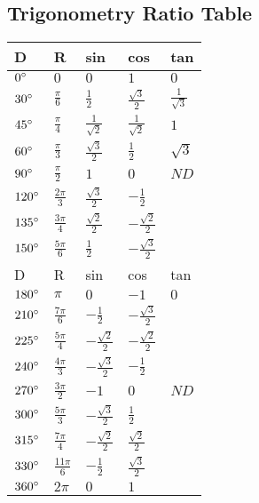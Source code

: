 \documentclass{extarticle}
\begin{document}
\begin{multicols}{2}
\section{Trigonometry Ratio Table}
    \begin{tabu}{|X|X|X|X|X|}
    \hline
D				& R					& sin				& cos						& tan						\\ \hline
$0\degree$	& $0$					& $0$				& $1$						& $0$						\\ \hline
$30\degree$	& $\frac{\pi}{6}$	& $\frac{1}{2}$	& $\frac{\sqrt{3}}{2}$	& $\frac{1}{\sqrt{3}}$	\\ \hline
$45\degree$	& $\frac{\pi}{4}$	& $\frac{1}{\sqrt{2}}$	& $\frac{1}{\sqrt{2}}$	& $1$	\\ \hline
$60\degree$	& $\frac{\pi}{3}$	& $\frac{\sqrt{3}}{2}$	& $\frac{1}{2}$	& $\sqrt{3}$	\\ \hline
$90\degree$	& $\frac{\pi}{2}$	& $1$	& $0$	& $ND$	\\ \hline
$120\degree$	& $\frac{2\pi}{3}$	& $\frac{\sqrt{3}}{2}$	& $-\frac{1}{2}$	& $ $	\\ \hline
$135\degree$	& $\frac{3\pi}{4}$	& $\frac{\sqrt{2}}{2}$	& $-\frac{\sqrt{2}}{2}$	& $ $	\\ \hline
$150\degree$	& $\frac{5\pi}{6}$	& $\frac{1}{2}$	& $-\frac{\sqrt{3}}{2}$	& $ $	\\ \hline
D				& R					& sin				& cos						& tan						\\ \hline
$180\degree$	& $\pi$					& $0$				& $-1$						& $0$						\\ \hline
$210\degree$	& $\frac{7\pi}{6}$	& $-\frac{1}{2}$	& $-\frac{\sqrt{3}}{2}$	& $ $	\\ \hline
$225\degree$	& $\frac{5\pi}{4}$	& $-\frac{\sqrt{2}}{2}$	& $-\frac{\sqrt{2}}{2}$	& $ $	\\ \hline
$240\degree$	& $\frac{4\pi}{3}$	& $-\frac{\sqrt{3}}{2}$	& $-\frac{1}{2}$	& $ $	\\ \hline
$270\degree$	& $\frac{3\pi}{2}$	& $-1$	& $0$	& $ND$	\\ \hline
$300\degree$	& $\frac{5\pi}{3}$	& $-\frac{\sqrt{3}}{2}$	& $\frac{1}{2}$	& $ $	\\ \hline
$315\degree$	& $\frac{7\pi}{4}$	& $-\frac{\sqrt{2}}{2}$	& $\frac{\sqrt{2}}{2}$	& $ $	\\ \hline
$330\degree$	& $\frac{11\pi}{6}$	& $-\frac{1}{2}$	& $\frac{\sqrt{3}}{2}$	& $ $	\\ \hline


$360\degree$ & $2\pi$ & $0$ & $1$ & $ $ \\ \hline
    \end{tabu}




\end{multicols}
\end{document}
